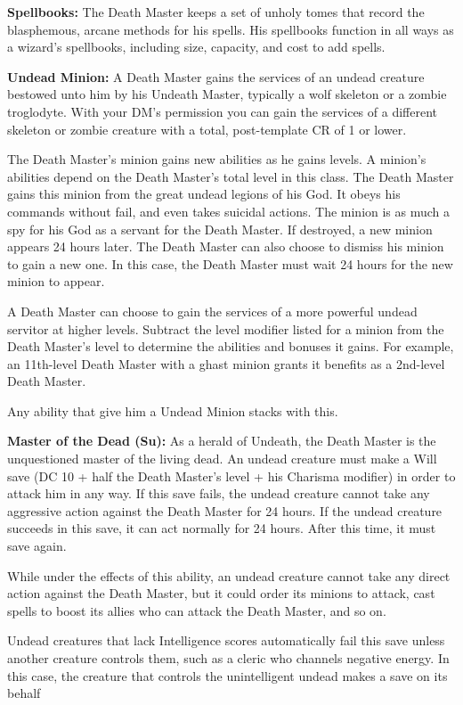 \textbf{Spellbooks:} The Death Master keeps a set of unholy tomes that record the blasphemous, arcane methods for his spells. His spellbooks function in all ways as a wizard's spellbooks, including size, capacity, and cost to add spells.

\textbf{Undead Minion:} A Death Master gains the services of an undead creature bestowed unto him by his Undeath Master, typically a wolf skeleton or a zombie troglodyte. With your DM's permission you can gain the services of a different skeleton or zombie creature with a total, post-template CR of 1 or lower.

The Death Master's minion gains new abilities as he gains levels. A minion's abilities depend on the Death Master's total level in this class. The Death Master gains this minion from the great undead legions of his God. It obeys his commands without fail, and even takes suicidal actions. The minion is as much a spy for his God as a servant for the Death Master. If destroyed, a new minion appears 24 hours later. The Death Master can also choose to dismiss his minion to gain a new one. In this case, the Death Master must wait 24 hours for the new minion to appear.

A Death Master can choose to gain the services of a more powerful undead servitor at higher levels. Subtract the level modifier listed for a minion from the Death Master's level to determine the abilities and bonuses it gains. For example, an 11th-level Death Master with a ghast minion grants it benefits as a 2nd-level Death Master.

Any ability that give him a Undead Minion stacks with this.

\textbf{Master of the Dead (Su):} As a herald of Undeath, the Death Master is the unquestioned master of the living dead. An undead creature must make a Will save (DC 10 + half the Death Master's level + his Charisma modifier) in order to attack him in any way. If this save fails, the undead creature cannot take any aggressive action against the Death Master for 24 hours. If the undead creature succeeds in this save, it can act normally for 24 hours. After this time, it must save again.

While under the effects of this ability, an undead creature cannot take any direct action against the Death Master, but it could order its minions to attack, cast spells to boost its allies who can attack the Death Master, and so on.

Undead creatures that lack Intelligence scores automatically fail this save unless another creature controls them, such as a cleric who channels negative energy. In this case, the creature that controls the unintelligent undead makes a save on its behalf

